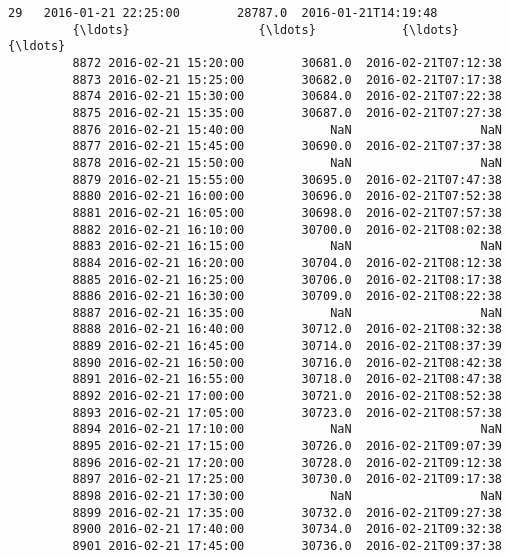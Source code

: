 \documentclass[11pt]{article}
\begin{document}
\begin{Verbatim}[commandchars=\\\{\}]
         29   2016-01-21 22:25:00        28787.0  2016-01-21T14:19:48   
         {\ldots}                  {\ldots}            {\ldots}                  {\ldots}   
         8872 2016-02-21 15:20:00        30681.0  2016-02-21T07:12:38   
         8873 2016-02-21 15:25:00        30682.0  2016-02-21T07:17:38   
         8874 2016-02-21 15:30:00        30684.0  2016-02-21T07:22:38   
         8875 2016-02-21 15:35:00        30687.0  2016-02-21T07:27:38   
         8876 2016-02-21 15:40:00            NaN                  NaN   
         8877 2016-02-21 15:45:00        30690.0  2016-02-21T07:37:38   
         8878 2016-02-21 15:50:00            NaN                  NaN   
         8879 2016-02-21 15:55:00        30695.0  2016-02-21T07:47:38   
         8880 2016-02-21 16:00:00        30696.0  2016-02-21T07:52:38   
         8881 2016-02-21 16:05:00        30698.0  2016-02-21T07:57:38   
         8882 2016-02-21 16:10:00        30700.0  2016-02-21T08:02:38   
         8883 2016-02-21 16:15:00            NaN                  NaN   
         8884 2016-02-21 16:20:00        30704.0  2016-02-21T08:12:38   
         8885 2016-02-21 16:25:00        30706.0  2016-02-21T08:17:38   
         8886 2016-02-21 16:30:00        30709.0  2016-02-21T08:22:38   
         8887 2016-02-21 16:35:00            NaN                  NaN   
         8888 2016-02-21 16:40:00        30712.0  2016-02-21T08:32:38   
         8889 2016-02-21 16:45:00        30714.0  2016-02-21T08:37:39   
         8890 2016-02-21 16:50:00        30716.0  2016-02-21T08:42:38   
         8891 2016-02-21 16:55:00        30718.0  2016-02-21T08:47:38   
         8892 2016-02-21 17:00:00        30721.0  2016-02-21T08:52:38   
         8893 2016-02-21 17:05:00        30723.0  2016-02-21T08:57:38   
         8894 2016-02-21 17:10:00            NaN                  NaN   
         8895 2016-02-21 17:15:00        30726.0  2016-02-21T09:07:39   
         8896 2016-02-21 17:20:00        30728.0  2016-02-21T09:12:38   
         8897 2016-02-21 17:25:00        30730.0  2016-02-21T09:17:38   
         8898 2016-02-21 17:30:00            NaN                  NaN   
         8899 2016-02-21 17:35:00        30732.0  2016-02-21T09:27:38   
         8900 2016-02-21 17:40:00        30734.0  2016-02-21T09:32:38   
         8901 2016-02-21 17:45:00        30736.0  2016-02-21T09:37:38   
         

\end{Verbatim}
\end{document}
